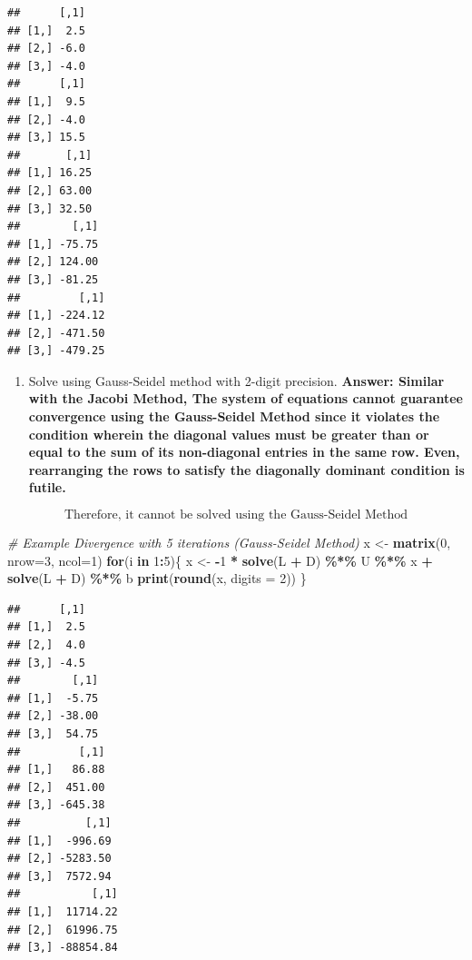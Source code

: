 \documentclass[
]{article}
\newenvironment{Shaded}{\begin{snugshade}}{\end{snugshade}}
\newcommand{\AttributeTok}[1]{\textcolor[rgb]{0.13,0.29,0.53}{#1}}
\newcommand{\CommentTok}[1]{\textcolor[rgb]{0.56,0.35,0.01}{\textit{#1}}}
\newcommand{\ControlFlowTok}[1]{\textcolor[rgb]{0.13,0.29,0.53}{\textbf{#1}}}
\newcommand{\DecValTok}[1]{\textcolor[rgb]{0.00,0.00,0.81}{#1}}
\newcommand{\FunctionTok}[1]{\textcolor[rgb]{0.13,0.29,0.53}{\textbf{#1}}}
\newcommand{\NormalTok}[1]{#1}
\newcommand{\OtherTok}[1]{\textcolor[rgb]{0.56,0.35,0.01}{#1}}
\newcommand{\SpecialCharTok}[1]{\textcolor[rgb]{0.81,0.36,0.00}{\textbf{#1}}}
\providecommand{\tightlist}{%
  \setlength{\itemsep}{0pt}\setlength{\parskip}{0pt}}
\begin{document}
\begin{verbatim}
##      [,1]
## [1,]  2.5
## [2,] -6.0
## [3,] -4.0
##      [,1]
## [1,]  9.5
## [2,] -4.0
## [3,] 15.5
##       [,1]
## [1,] 16.25
## [2,] 63.00
## [3,] 32.50
##        [,1]
## [1,] -75.75
## [2,] 124.00
## [3,] -81.25
##         [,1]
## [1,] -224.12
## [2,] -471.50
## [3,] -479.25
\end{verbatim}

\begin{enumerate}
\def\labelenumi{\alph{enumi}.}
\setcounter{enumi}{1}
\tightlist
\item
  Solve using Gauss-Seidel method with 2-digit precision.
  \textbf{Answer: Similar with the Jacobi Method, The system of
  equations cannot guarantee convergence using the Gauss-Seidel Method
  since it violates the condition wherein the diagonal values must be
  greater than or equal to the sum of its non-diagonal entries in the
  same row. Even, rearranging the rows to satisfy the diagonally
  dominant condition is futile.}
\end{enumerate}

\[
\boxed{
\text{Therefore, it cannot be solved using the Gauss-Seidel Method}
}
\]

\begin{Shaded}
\begin{Highlighting}[]
\CommentTok{\# Example Divergence with 5 iterations (Gauss{-}Seidel Method)}
\NormalTok{x }\OtherTok{\textless{}{-}} \FunctionTok{matrix}\NormalTok{(}\DecValTok{0}\NormalTok{, }\AttributeTok{nrow=}\DecValTok{3}\NormalTok{, }\AttributeTok{ncol=}\DecValTok{1}\NormalTok{)}
\ControlFlowTok{for}\NormalTok{(i }\ControlFlowTok{in} \DecValTok{1}\SpecialCharTok{:}\DecValTok{5}\NormalTok{)\{}
\NormalTok{  x }\OtherTok{\textless{}{-}} \SpecialCharTok{{-}}\DecValTok{1} \SpecialCharTok{*} \FunctionTok{solve}\NormalTok{(L }\SpecialCharTok{+}\NormalTok{ D) }\SpecialCharTok{\%*\%}\NormalTok{ U }\SpecialCharTok{\%*\%}\NormalTok{ x }\SpecialCharTok{+} \FunctionTok{solve}\NormalTok{(L }\SpecialCharTok{+}\NormalTok{ D) }\SpecialCharTok{\%*\%}\NormalTok{ b}
  \FunctionTok{print}\NormalTok{(}\FunctionTok{round}\NormalTok{(x, }\AttributeTok{digits =} \DecValTok{2}\NormalTok{))}
\NormalTok{\}}
\end{Highlighting}
\end{Shaded}

\begin{verbatim}
##      [,1]
## [1,]  2.5
## [2,]  4.0
## [3,] -4.5
##        [,1]
## [1,]  -5.75
## [2,] -38.00
## [3,]  54.75
##         [,1]
## [1,]   86.88
## [2,]  451.00
## [3,] -645.38
##          [,1]
## [1,]  -996.69
## [2,] -5283.50
## [3,]  7572.94
##           [,1]
## [1,]  11714.22
## [2,]  61996.75
## [3,] -88854.84
\end{verbatim}
\end{document}

